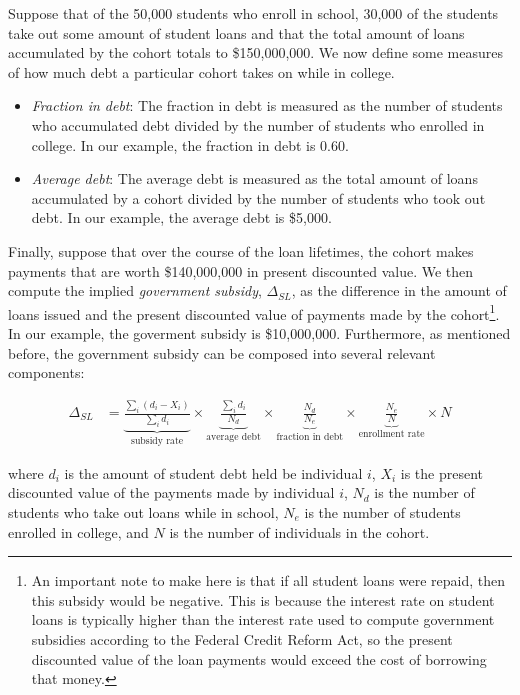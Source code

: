   Suppose that of the 50,000 students who enroll in school, 30,000 of the students take out some
  amount of student loans and that the total amount of loans accumulated by the cohort totals to
  \$150,000,000. We now define some measures of how much debt a particular cohort takes on while in
  college.

  \begin{itemize}
    \item \textit{Fraction in debt}: The fraction in debt is measured as the number of students who
          accumulated debt divided by the number of students who enrolled in college. In our
          example, the fraction in debt is 0.60.
    \item \textit{Average debt}: The average debt is measured as the total amount of loans
          accumulated by a cohort divided by the number of students who took out debt. In our
          example, the average debt is \$5,000.
  \end{itemize}

  Finally, suppose that over the course of the loan lifetimes, the cohort makes payments that are
  worth \$140,000,000 in present discounted value. We then compute the implied \textit{government
  subsidy}, $\Delta_{SL}$, as the difference in the amount of loans issued and the present
  discounted value of payments made by the cohort\footnote{An important note to make here is that if
  all student loans were repaid, then this subsidy would be negative. This is because the interest
  rate on student loans is typically higher than the interest rate used to compute government
  subsidies according to the Federal Credit Reform Act, so the present discounted value of the loan
  payments would exceed the cost of borrowing that money.}. In our example, the goverment subsidy is
  \$10,000,000. Furthermore, as mentioned before, the government subsidy can be composed into
  several relevant components:

  \begin{align} \label{eq:gov_subsidy}
    \Delta_{SL} &= \underbrace{\frac{\sum_i (d_i - X_i)}{\sum_i d_i}}_{\text{subsidy rate}} \times
                   \underbrace{\frac{\sum_i d_i}{N_d}}_{\text{average debt}} \times
                   \underbrace{\frac{N_d}{N_e}}_{\text{fraction in debt}} \times
                   \underbrace{\frac{N_e}{N}}_{\text{enrollment rate}} \times
                   N
  \end{align}

  where $d_i$ is the amount of student debt held be individual $i$, $X_i$ is the present discounted
  value of the payments made by individual $i$, $N_d$ is the number of students who take out loans
  while in school, $N_e$ is the number of students enrolled in college, and $N$ is the number of
  individuals in the cohort.


